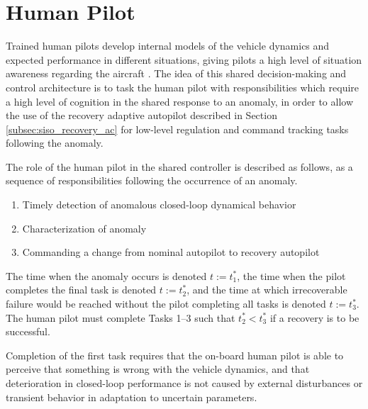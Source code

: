 \section{Human Pilot} \label{sec:siso_sc_human}
Trained human pilots develop internal models of the vehicle dynamics and expected performance in different situations, giving pilots a high level of situation awareness regarding the aircraft \cite{endsley1995toward}. The idea of this shared decision-making and control architecture is to task the human pilot with responsibilities which require a high level of cognition in the shared response to an anomaly, in order to allow the use of the recovery adaptive autopilot described in Section \ref{subsec:siso_recovery_ac} for low-level regulation and command tracking tasks following the anomaly. 

The role of the human pilot in the shared controller is described as follows, as a sequence of responsibilities following the occurrence of an anomaly.
\begin{enumerate}[label=\textbf{Task \arabic*.}, leftmargin=1.8cm]
	\item Timely detection of anomalous closed-loop dynamical behavior
	\item Characterization of anomaly
	\item Commanding a change from nominal autopilot to recovery autopilot
\end{enumerate}

The time when the anomaly occurs is denoted $t := t_1^*$, the time when the pilot completes the final task is denoted $t := t_2^*$, and the time at which irrecoverable failure would be reached without the pilot completing all tasks is denoted $t := t_3^*$. The human pilot must complete Tasks 1--3 such that $t_2^* < t_3^*$ if a recovery is to be successful.

Completion of the first task requires that the on-board human pilot is able to perceive that something is wrong with the vehicle dynamics, and that deterioration in closed-loop performance is not caused by external disturbances or transient behavior in adaptation to uncertain parameters.

